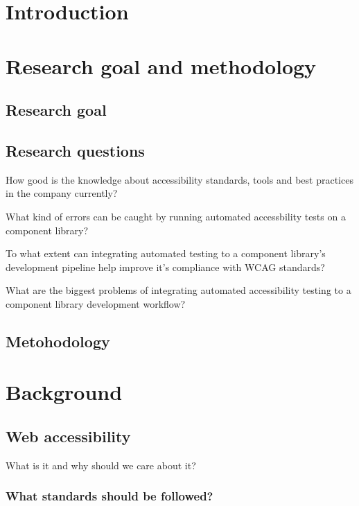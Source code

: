 \documentclass{master_thesis}
\begin{document}
\tableofcontents
\pagebreak


\section{Introduction}

\section{Research goal and methodology}

\subsection{Research goal}
\subsection{Research questions}

\begin{RQlist}
    \item How good is the knowledge about accessibility standards, tools and best practices in the company currently?
    \item What kind of errors can be caught by running automated accessbility tests on a component library?
    \item To what extent can integrating automated testing to a component library's development pipeline help improve it's compliance with WCAG standards?
    \item What are the biggest problems of integrating automated accessibility testing to a component library development workflow?
\end{RQlist}
\subsection{Metohodology}

\section{Background}

\subsection{Web accessibility}
% 
What is it and why should we care about it?
\subsubsection{What standards should be followed?}
\end{document}
